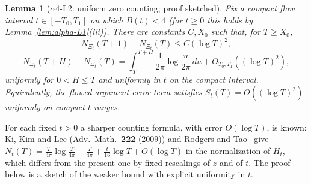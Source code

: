 \documentclass[11pt]{amsart}
\newtheorem{lemma}[theorem]{Lemma}
\theoremstyle{definition}
\theoremstyle{remark}
\theoremstyle{definition}
\begin{document}
\begin{lemma}[$\alpha4$-L2: uniform zero counting; proof sketched]\label{lem:alpha-L2}\label{lem:alpha-L2-full}
Fix a compact flow interval $t\in[-T_0,T_1]$ on which $B(t)<4$ (for $t\ge0$ this holds by
Lemma~\ref{lem:alpha-L1}(iii)).  There are constants $C,X_0$ such that, for
$T\ge X_0$,
\[
   N_{\Xi_t}(T+1)-N_{\Xi_t}(T)\le C(\log T)^2,
\]
\[
   N_{\Xi_t}(T+H)-N_{\Xi_t}(T)
   =
   \int_T^{T+H}\frac1{2\pi}\log\frac{u}{2\pi}\,du+O_{T_0,T_1}((\log T)^2),
\]
uniformly for $0<H\le T$ and uniformly in $t$ on the compact interval.  Equivalently, the flowed
argument-error term satisfies $S_t(T)=O((\log T)^2)$ uniformly on compact $t$-ranges.
\end{lemma}

\noindent For each fixed $t>0$ a sharper counting formula, with error $O(\log T)$, is known: Ki, Kim and
Lee (Adv.\ Math.\ \textbf{222} (2009)) and Rodgers and Tao~\cite{RodgersTao} give
$N_t(T)=\tfrac T{4\pi}\log\tfrac T{4\pi}-\tfrac T{4\pi}+\tfrac t{16}\log T+O(\log T)$ in the
normalization of $H_t$, which differs from the present one by fixed rescalings of $z$ and of $t$.  The proof below is a sketch of the weaker bound with explicit uniformity in $t$.
\end{document}
